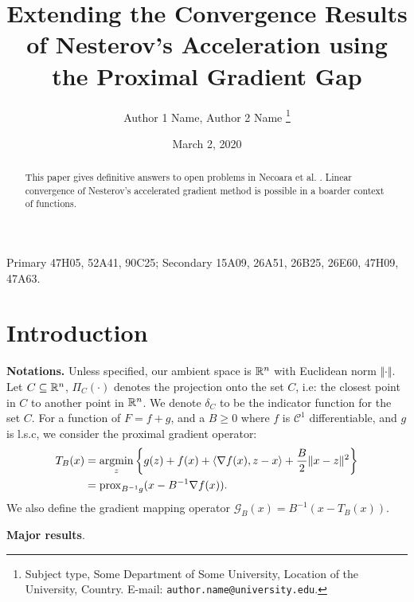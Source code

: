 \documentclass[12pt]{article}
\begin{document}
\newcommand{\dist}{\ensuremath{\operatorname{dist}}}

\title{{\selectfont Extending the Convergence Results of Nesterov's Acceleration using the Proximal Gradient Gap}}

\author{
    Author 1 Name, Author 2 Name
    \thanks{
        Subject type, Some Department of Some University, Location of the University,
        Country. E-mail: \texttt{author.name@university.edu}.
    }
}

\date{March 2, 2020}

\maketitle
{}

\begin{abstract} 
    This paper gives definitive answers to open problems in Necoara et al. \cite{necoara_linear_2019}. 
    Linear convergence of Nesterov's accelerated gradient method is possible in a boarder context of functions. 
\end{abstract}

Primary 47H05, 52A41, 90C25; Secondary 15A09, 26A51, 26B25, 26E60, 47H09, 47A63.


\section{Introduction}
    \textbf{Notations.}
    Unless specified, our ambient space is $\mathbb R^n$ with Euclidean norm $\Vert \cdot\Vert$.
    Let $C\subseteq \mathbb R^n$, $\Pi_C(\cdot)$ denotes the projection onto the set $C$, i.e: the closest point in $C$ to another point in $\mathbb R^n$. 
    We denote $\delta_C$ to be the indicator function for the set $C$. 
    For a function of $F = f + g$, and a $B\ge 0$ where $f$ is $\mathcal C^1$ differentiable, and $g$ is l.s.c, we consider the proximal gradient operator: 
    \begin{align*}
        T_B(x) &= \mathop{\rm argmin}\limits_{z} \left\lbrace
            g(z) + f(x) + \langle \nabla f(x), z - x\rangle + \frac{B}{2}\Vert x - z\Vert^2
        \right\rbrace
        \\
        &= \operatorname{prox}_{B^{-1}g}(x - B^{-1}\nabla f(x)). 
    \end{align*}
    We also define the gradient mapping operator $\mathcal G_B(x) = B^{-1}(x - T_B(x))$. 
    \par
    \textbf{Major results}. 
    
\end{document}
